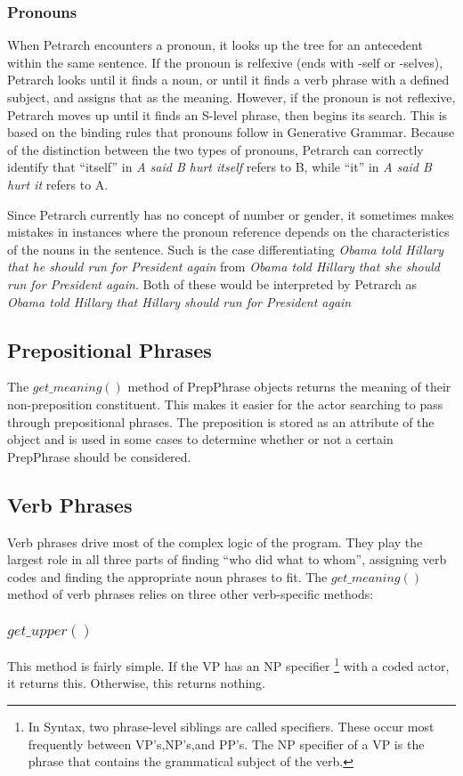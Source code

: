 \documentclass[11pt]{article}
\begin{document}
\subsubsection{Pronouns}
When Petrarch encounters a pronoun, it looks up the tree for an antecedent within the same 
sentence. If the pronoun is relfexive (ends with -self or -selves), Petrarch 
looks until it finds a noun, or until it finds a verb phrase with a defined 
subject, and assigns that as the meaning. However, if the pronoun is not 
reflexive,  Petrarch moves up until it finds an S-level phrase, then begins its 
search. This is based on the binding rules that pronouns follow in Generative Grammar. 
Because of the distinction between the two types of pronouns, Petrarch can 
correctly identify that ``itself'' in \textit{A said B hurt itself} refers to B, 
while ``it'' in \textit{A said B hurt it} refers to A. 

Since Petrarch currently has no concept of number or gender, it sometimes makes mistakes
in instances where the pronoun reference depends on the characteristics of the 
nouns in the sentence. Such is the case differentiating \textit{Obama told Hillary 
that he should run for President again} from \textit{Obama told Hillary that she should run
for President again}. Both of these would be interpreted by Petrarch as  \textit{Obama told Hillary that Hillary should run
for President again}

\subsection{Prepositional Phrases}
The $get\_meaning()$ method of PrepPhrase objects returns the meaning of their 
non-preposition constituent. This makes it easier for the actor searching to 
pass through prepositional phrases. The preposition is stored as an attribute of 
the object and is used in some cases to determine whether or not a certain PrepPhrase should 
be considered. 
\subsection{Verb Phrases}
Verb phrases drive most of the complex logic of the program. They play the 
largest role in all three parts of finding ``who did what to whom'', assigning verb 
codes and finding the appropriate noun phrases to fit. The $get\_meaning()$ 
method of verb phrases relies on three other verb-specific methods:
\subsubsection{$get\_upper()$}
This method is fairly simple. If the VP has an NP specifier \footnote{In Syntax, two phrase-level 
siblings are called specifiers. These occur most frequently between VP's,NP's,and PP's. The NP specifier 
of a VP is the phrase that contains the grammatical subject of the verb.} with a coded 
actor, it returns this. Otherwise, this returns nothing. 
\end{document}
